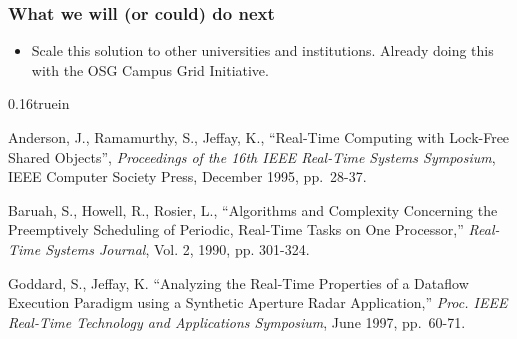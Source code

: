 \documentclass[11pt]{article}
\newcommand{\singlespace}{\baselineskip0.16truein}
\begin{document}
\subsubsection*{What we will (or could) do next}
\begin{itemize}

\item 
Scale this solution to other universities and institutions.  Already doing this with the OSG Campus Grid Initiative.

\end{itemize}





\begin{thebibliography}{99}%
\singlespace

 Anderson, J., Ramamurthy, S., Jeffay, K.,
``Real-Time Computing with Lock-Free Shared Objects''\negthinspace,
{\em Proceedings of the 16th IEEE Real-Time Systems Symposium\/},
IEEE Computer Society Press, December 1995, pp.\ 28-37.

 Baruah, S., Howell, R., Rosier, L.,
``Algorithms and Complexity Concerning the Preemptively Scheduling of Periodic,
Real-Time Tasks on One Processor,'' {\em Real-Time Systems Journal\/},
Vol. 2, 1990, pp. 301-324.


 Goddard, S., Jeffay, K. ``Analyzing the Real-Time Properties of
a Dataflow Execution Paradigm using a Synthetic Aperture Radar Application,''
{\em Proc. IEEE Real-Time Technology and Applications
Symposium\/}, June 1997, pp.\ 60-71.

%

\end{thebibliography}
\end{document}

